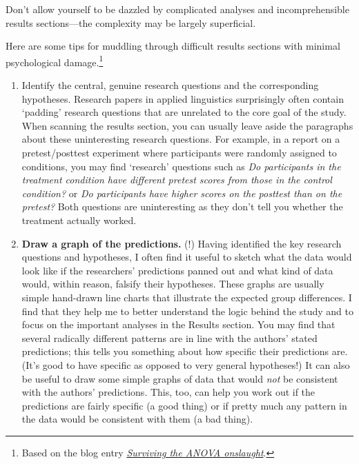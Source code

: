 \documentclass[a4paper]{tufte-book}\usepackage[]{graphicx}\usepackage[]{xcolor}
\begin{document}
\begin{framed}
 Don't allow yourself to be dazzled by complicated analyses and 
 incomprehensible results sections---the complexity may be
 largely superficial.
\end{framed}

Here are some tips for muddling through difficult results sections with minimal
psychological damage.\footnote{Based on the blog entry \href{https://janhove.github.io/posts/2016-05-18-surviving-anova-onslaught/}{\textit{Surviving the ANOVA onslaught}}.}

\begin{enumerate}
  \item Identify the central, genuine research questions and the corresponding hypotheses.
Research papers in applied linguistics surprisingly often contain `padding' research questions 
that are unrelated to the core goal of the study. 
When scanning the results section, 
you can usually leave aside the paragraphs about these uninteresting research questions. 
For example, in a report on a pretest/posttest experiment where participants 
were randomly assigned to conditions, you may find `research' questions such as 
\textit{Do participants in the treatment condition have different pretest scores from those in the control condition?} 
or \textit{Do participants have higher scores on the posttest than on the pretest?} 
Both questions are uninteresting as they don't tell you whether the treatment actually worked.
  
  \item \textbf{Draw a graph of the predictions.} (!)
  Having identified the key research questions and hypotheses, 
  I often find it useful to sketch what the data would look like if the 
  researchers' predictions panned out and what kind of data would, 
  within reason, falsify their hypotheses. 
  These graphs are usually simple hand-drawn line charts that 
  illustrate the expected group differences. 
  I find that they help me to better understand the logic behind the study and 
  to focus on the important analyses in the Results section.
  You may find that several radically different patterns are in line with the 
  authors' stated predictions; this tells you something about
  how specific their predictions are. 
  (It's good to have specific as opposed to very general hypotheses!)
  It can also be useful to draw some simple graphs of data that
  would \emph{not} be consistent with the authors' predictions.
  This, too, can help you work out if the predictions are fairly specific
  (a good thing) or if pretty much any pattern in the data would be
  consistent with them (a bad thing).
  

\end{enumerate}
\end{document}
